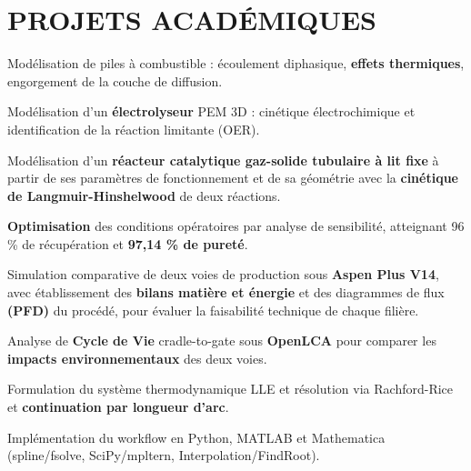 \documentclass[10pt]{article}
\begin{document}
\section{PROJETS ACADÉMIQUES}
\begin{bul}
\item Modélisation de piles à combustible : écoulement diphasique, \textbf{effets thermiques}, engorgement de la couche de diffusion.
\item Modélisation d'un \textbf{électrolyseur} PEM 3D : cinétique électrochimique et identification de la réaction limitante (OER).
\end{bul}
\begin{bul}
\item Modélisation d'un \textbf{réacteur catalytique gaz-solide tubulaire à lit fixe} à partir de ses paramètres de fonctionnement et de sa géométrie avec la \textbf{cinétique de Langmuir-Hinshelwood} de deux réactions.
\item \textbf{Optimisation} des conditions opératoires par analyse de sensibilité, atteignant 96 \% de récupération et \textbf{97,14 \% de pureté}.
\end{bul}
\begin{bul}
\item Simulation comparative de deux voies de production sous \textbf{Aspen Plus V14}, avec établissement des \textbf{bilans matière et énergie} et des diagrammes de flux \textbf{(PFD)} du procédé, pour évaluer la faisabilité technique de chaque filière.
\item Analyse de \textbf{Cycle de Vie} cradle-to-gate sous \textbf{OpenLCA} pour comparer les \textbf{impacts environnementaux} des deux voies.
\end{bul}
\begin{bul}
\item Formulation du système thermodynamique LLE et résolution via Rachford-Rice et \textbf{continuation par longueur d'arc}.
\item Implémentation du workflow en Python, MATLAB et Mathematica (spline/fsolve, SciPy/mpltern, Interpolation/FindRoot).
\end{bul}
\end{document}
